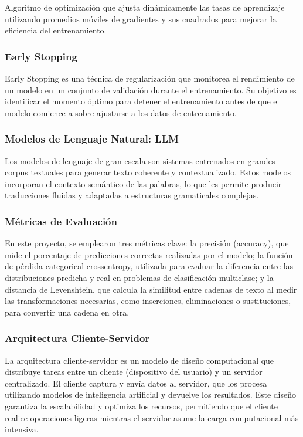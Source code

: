 \documentclass{article}
\begin{document}
Algoritmo de optimización que ajusta dinámicamente las tasas de aprendizaje utilizando promedios móviles de gradientes y sus cuadrados para mejorar la eficiencia del entrenamiento.

\subsubsection{Early Stopping}

Early Stopping es una técnica de regularización que monitorea el rendimiento de un modelo en un conjunto de validación durante el entrenamiento. Su objetivo es identificar el momento óptimo para detener el entrenamiento antes de que el modelo comience a sobre ajustarse a los datos de entrenamiento. 

\subsubsection{Modelos de Lenguaje Natural: LLM}

Los modelos de lenguaje de gran escala son sistemas entrenados en grandes corpus textuales para generar texto coherente y contextualizado. Estos modelos incorporan el contexto semántico de las palabras, lo que les permite producir traducciones fluidas y adaptadas a estructuras gramaticales complejas.

\subsubsection{Métricas de Evaluación}

En este proyecto, se emplearon tres métricas clave: la precisión (accuracy), que mide el porcentaje de predicciones correctas realizadas por el modelo; la función de pérdida categorical crossentropy, utilizada para evaluar la diferencia entre las distribuciones predicha y real en problemas de clasificación multiclase; y la distancia de Levenshtein, que calcula la similitud entre cadenas de texto al medir las transformaciones necesarias, como inserciones, eliminaciones o sustituciones, para convertir una cadena en otra. 

\subsubsection{Arquitectura Cliente-Servidor}

La arquitectura cliente-servidor es un modelo de diseño computacional que distribuye tareas entre un cliente (dispositivo del usuario) y un servidor centralizado. El cliente captura y envía datos al servidor, que los procesa utilizando modelos de inteligencia artificial y devuelve los resultados. Este diseño garantiza la escalabilidad y optimiza los recursos, permitiendo que el cliente realice operaciones ligeras mientras el servidor asume la carga computacional más intensiva.
\end{document}
